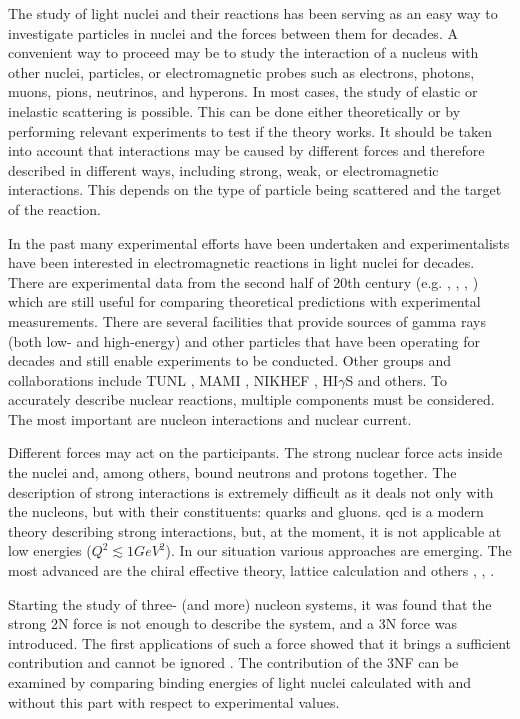 The study of light nuclei and their reactions has been serving as an easy way to investigate particles in nuclei and
the forces between them for decades. A convenient way to proceed may be to study the interaction of a nucleus with
other nuclei, particles, or electromagnetic probes such as electrons, photons, muons, pions, neutrinos, and hyperons.
In most cases, the study of elastic or inelastic scattering is possible. This can be done either theoretically or by
performing relevant experiments to test if the theory works. It should be taken into account that interactions may be
caused by different forces and therefore described in different ways, including strong, weak, or electromagnetic
interactions. This depends on the type of particle being scattered and the target of the reaction.

In the past many experimental efforts have been undertaken and
experimentalists have been interested in electromagnetic reactions in light nuclei for decades.
There are experimental data from the second half of 20th century (e.g. \cite{Skopik1974}, \cite{Liuexp68}, \cite{Kose1969MeasurementsOT}, \cite{Kamae}) which are still 
useful for comparing theoretical predictions with experimental measurements.    
There are several facilities that provide sources of gamma rays (both low- and high-energy)
and other particles that have been operating for decades and still enable experiments to be conducted.
Other groups and collaborations include TUNL \cite{TUNL}, MAMI \cite{MAMI}, 
NIKHEF \cite{NIKHEF}, HI$\gamma$S \cite{TONCHEV2005170} and others.
To accurately describe nuclear reactions, multiple components must be considered.
The most important are nucleon interactions and nuclear current.

Different forces may act on
the participants.
The strong nuclear force acts inside the nuclei and, among others, bound neutrons 
and protons together. The description of strong interactions is extremely
difficult as it deals not only with the nucleons, but with their constituents: quarks
and gluons. \gls{qcd} is a modern theory
describing strong interactions, but, at the moment,
it is not applicable at low energies ($Q^2 \lesssim 1 GeV^2$).
In our situation various approaches are emerging.
The most advanced are the
chiral effective theory, lattice calculation and others \cite{IOFFE2006232}, \cite{BEANElaticce}, \cite{Machleidt2011}.

Starting the study of three- (and more) nucleon systems, it was found that
the strong 2N force is not enough to describe
the system, and a 3N force was introduced. The first applications of such
a force showed that it brings a
sufficient contribution and cannot be ignored \cite{GLOCKLE1982343}.
The contribution of the 3NF can be examined by
comparing binding energies of light nuclei calculated with
and without this part with respect to experimental values.

